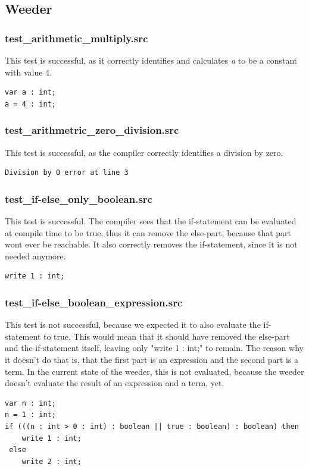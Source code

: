 \documentclass[a4paper,10pt,titlepage]{report}
\begin{document}
\subsection{Weeder}
\subsubsection{test\_arithmetic\_multiply.src}
This test is successful, as it correctly identifies and calculates \textit{a} to be a constant with value 4.
\begin{lstlisting}
var a : int;
a = 4 : int;
\end{lstlisting}

\subsubsection{test\_arithmetric\_zero\_division.src}
This test is successful, as the compiler correctly identifies a division by zero.
\begin{lstlisting}
Division by 0 error at line 3
\end{lstlisting}

\subsubsection{test\_if-else\_only\_boolean.src}
This test is successful. The compiler sees that the if-statement can be evaluated at compile time to be true, thus it can remove the else-part, because that part wont ever be reachable. It also correctly removes the if-statement, since it is not needed anymore.
\begin{lstlisting}
write 1 : int;
\end{lstlisting}

\subsubsection{test\_if-else\_boolean\_expression.src}
This test is not successful, because we expected it to also evaluate the if-statement to true. This would mean that it should have removed the else-part and the if-statement itself, leaving only "\textsf{write 1 : int;}" to remain. The reason why it doesn't do that is, that the first part is an expression and the second part is a term. In the current state of the weeder, this is not evaluated, because the weeder doesn't evaluate the result of an expression and a term, yet.
\begin{lstlisting}
var n : int;
n = 1 : int;
if (((n : int > 0 : int) : boolean || true : boolean) : boolean) then
    write 1 : int;
 else
    write 2 : int;
\end{lstlisting}
\end{document}
